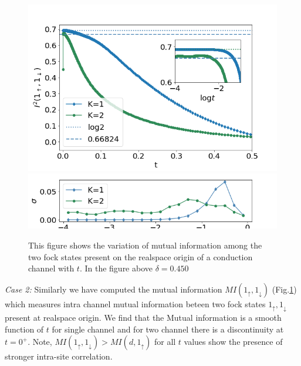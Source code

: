 \documentclass[reprint,prb,superscriptaddress]{revtex4-2}
\begin{document}
\begin{figure}[!htpb]
\includegraphics[scale=0.4]{plt/A_I2_ch12_['1_up','1_down']}
\includegraphics[scale=0.4]{plt/errorbar_A_I2_ch12_['1_up','1_down']}

\caption{This figure shows the variation of mutual information among the two fock states present on the realspace origin of a conduction channel with $t$. In the figure above $\delta=0.450$}
\label{fig:MI_1_2_vs_t_K}
\end{figure}

\par\textit{Case 2:} Similarly we have computed the mutual information $MI(1_{\uparrow},1_{\downarrow})$ (Fig.\ref{fig:MI_1_2_vs_t_K}) which measures intra channel  mutual information beteen two fock states $1_{\uparrow},1_{\downarrow}$ present at realspace origin. We find that the Mutual information is a smooth function of $t$ for single channel and for two channel there is a discontinuity at $t=0^{+}$. Note, $MI(1_{\uparrow},1_{\downarrow})>MI(d,1_{\uparrow})$ for all $t$ values show the presence of stronger intra-site correlation.
\end{document}
